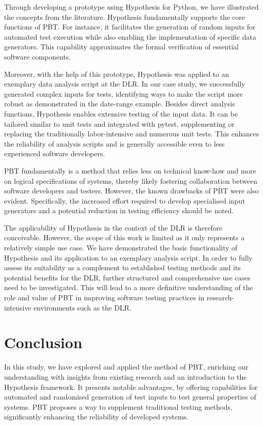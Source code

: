 \documentclass[runningheads]{llncs}
\begin{document}
Through developing a prototype using Hypothesis for Python, we have illustrated the concepts from the literature. Hypothesis fundamentally supports the core functions of PBT. For instance, it facilitates the generation of random inputs for automated test execution while also enabling the implementation of specific data generators. This capability approximates the formal verification of essential software components.

Moreover, with the help of this prototype, Hypothesis was applied to an exemplary data analysis script at the DLR. In our case study, we successfully generated complex inputs for tests, identifying ways to make the script more robust as demonstrated in the date-range example. Besides direct analysis functions, Hypothesis enables extensive testing of the input data. It can be tailored similar to unit tests and integrated with pytest, supplementing or replacing the traditionally labor-intensive and numerous unit tests. This enhances the reliability of analysis scripts and is generally accessible even to less experienced software developers.

PBT fundamentally is a method that relies less on technical know-how and more on logical specifications of systems, thereby likely fostering collaboration between software developers and testers. However, the known drawbacks of PBT were also evident. Specifically, the increased effort required to develop specialised input generators and a potential reduction in testing efficiency should be noted.

The applicability of Hypothesis in the context of the DLR is therefore conceivable. However, the scope of this work is limited as it only represents a relatively simple use case. We have demonstrated the basic functionality of Hypothesis and its application to an exemplary analysis script. In order to fully assess its suitability as a complement to established testing methods and its potential benefits for the DLR, further structured and comprehensive use cases need to be investigated. This will lead to a more definitive understanding of the role and value of PBT in improving software testing practices in research-intensive environments such as the DLR.

\section{Conclusion}
In this study, we have explored and applied the method of PBT, enriching our understanding with insights from existing research and an introduction to the Hypothesis framework. It presents notable advantages, by offering capabilities for automated and randomised generation of test inputs to test general properties of systems. PBT proposes a way to supplement traditional testing methods, significantly enhancing the reliability of developed systems.
\end{document}
